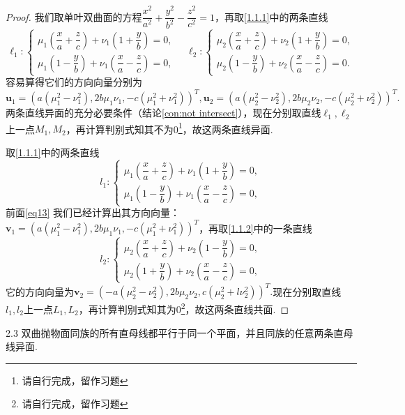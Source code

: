 \documentclass[12pt, a4paper,newtx]{ctexart}
\begin{document}
\begin{proof}
	我们取单叶双曲面的方程$\dfrac{x^2}{a^2} + \dfrac{y^2}{b^2} - \dfrac{z^2}{c^2} = 1$，再取\eqref{1.1.1}中的两条直线\[\ell_1:\begin{cases}
		\mu_1\left(\dfrac{x}a+\dfrac{z}{c}\right)+\nu_1\left(1+\dfrac{y}{b}\right)=0,\\\mu_1\left(1-\dfrac{y}{b}\right)+\nu_1\left(\dfrac{x}a-\dfrac{z}{c}\right)=0,
	\end{cases}\quad \ell_2:\begin{cases}
	\mu_2\left(\dfrac{x}a+\dfrac{z}{c}\right)+\nu_2\left(1+\dfrac{y}{b}\right)=0,\\\mu_2\left(1-\dfrac{y}{b}\right)+\nu_2\left(\dfrac{x}a-\dfrac{z}{c}\right)=0.
	\end{cases}\]
	容易算得它们的方向向量分别为\begin{equation}\label{eq13}
		\bm u_1=\left(a(\mu_1^2 - \nu_1^2),
		2b\mu_1\nu_1,-c(\mu_1^2 + \nu_1^2)\right)^T,\bm u_2=\left(a(\mu_2^2 - \nu_2^2),
		2b\mu_2\nu_2,-c(\mu_2^2 + \nu_2^2)\right)^T.\
	\end{equation}
	两条直线异面的充分必要条件（结论\ref{con:not intersect}），现在分别取直线$\ell_1,\ell_2$上一点$M_1,M_2$，再计算判别式知其不为0\footnote{请自行完成，留作习题}，故这两条直线异面.
	 
	取\eqref{1.1.1}中的两条直线\[l_1:\begin{cases}
		\mu_1\left(\dfrac{x}a+\dfrac{z}{c}\right)+\nu_1\left(1+\dfrac{y}{b}\right)=0,\\\mu_1\left(1-\dfrac{y}{b}\right)+\nu_1\left(\dfrac{x}a-\dfrac{z}{c}\right)=0,
	\end{cases}\]前面\eqref{eq13}
	我们已经计算出其方向向量：$\bm{v}_1=\left(a(\mu_1^2 - \nu_1^2),
	2b\mu_1\nu_1,-c(\mu_1^2 + \nu_1^2)\right)^T$，再取\eqref{1.1.2}中的一条直线\[l_2:\begin{cases}
	\mu_2\left(\dfrac{x}a+\dfrac{z}{c}\right)+\nu_2\left(1-\dfrac{y}{b}\right)=0,\\\mu_2\left(1+\dfrac{y}{b}\right)+\nu_2\left(\dfrac{x}a-\dfrac{z}{c}\right)=0,
	\end{cases}\]
	它的方向向量为$\bm{v}_2=\left(-a(\mu_2^2 - \nu_2^2),
	2b\mu_2\nu_2,c(\mu_2^2 +l \nu_2^2)\right)^T.$现在分别取直线$l_1,l_2$上一点$L_1,L_2$，再计算判别式知其为0\footnote{请自行完成，留作习题}，故这两条直线共面.
\end{proof}
\begin{property}{}{2.3}
	双曲抛物面同族的所有直母线都平行于同一个平面，并且同族的任意两条直母线异面. 
\end{property}
\end{document}
